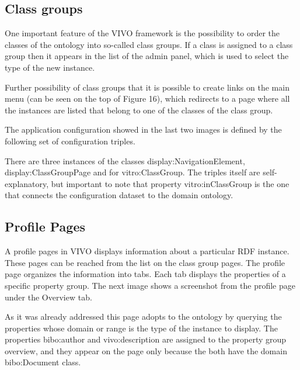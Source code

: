 \subsection{Class groups}

One important feature of the VIVO framework is the possibility to order the classes of the ontology into so-called class groups. If a class is assigned to a class group then it appears in the list of the admin panel, which is used to select the type of the new instance.


Further possibility of class groups that it is possible to create links on the main menu (can be seen on the top of Figure 16), which redirects to a page where all the instances are listed that belong to one of the classes of the class group. 


The application configuration showed in the last two images is  defined by the following set of configuration triples.


There are three instances of the classes display:NavigationElement, display:ClassGroupPage and for vitro:ClassGroup. The triples itself are self-explanatory, but important to note that property vitro:inClassGroup is the one that connects the configuration dataset to the domain ontology.  

\subsection{Profile Pages}

A profile pages in VIVO displays information about a particular RDF instance. These pages can be reached from the list on the class group pages. The profile page organizes the information into tabs. Each tab displays the properties of a specific property group.  The next image shows a screenshot from the profile page under the Overview tab.


As it was already addressed this page adopts to the ontology by querying the properties whose domain or range is the type of the instance to display.  The properties bibo:author and vivo:description are assigned to the property group overview, and they appear on the page only because the both have the domain bibo:Document class.

